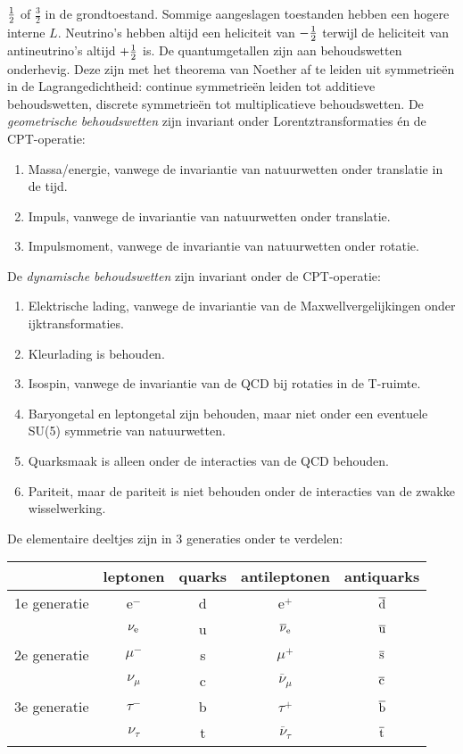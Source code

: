 $\mbox{$\frac{1}{2}$}$ of $\frac{3}{2}$ in de grondtoestand. Sommige aangeslagen toestanden
hebben een hogere interne $L$. Neutrino's hebben altijd een heliciteit van
$-\mbox{$\frac{1}{2}$}$ terwijl de heliciteit van antineutrino's altijd $+\mbox{$\frac{1}{2}$}$ is.
\npar
De quantumgetallen zijn aan behoudswetten onderhevig. Deze zijn met het
theorema van Noether af te leiden uit symmetrie\"en in de Lagrangedichtheid:
continue symmetrie\"en leiden tot additieve behoudswetten, discrete
symmetrie\"en tot multiplicatieve behoudswetten.
\npar
De {\it geometrische behoudswetten} zijn invariant onder Lorentztransformaties
\'en de CPT-operatie:
\begin{enumerate}
\setlength{\itemsep}{0mm}
\item Massa/energie, vanwege de invariantie van natuurwetten onder translatie in de tijd.
\item Impuls, vanwege de invariantie van natuurwetten onder translatie.
\item Impulsmoment, vanwege de invariantie van natuurwetten onder rotatie.
\end{enumerate}
De {\it dynamische behoudswetten} zijn invariant onder de CPT-operatie:
\begin{enumerate}
\setlength{\itemsep}{0mm}
\item Elektrische lading, vanwege de invariantie van de Maxwellvergelijkingen
      onder ijktransformaties.
\item Kleurlading is behouden.
\item Isospin, vanwege de invariantie van de QCD bij rotaties in de T-ruimte.
\item Baryongetal en leptongetal zijn behouden, maar niet onder een eventuele
      SU(5) symmetrie van natuurwetten.
\item Quarksmaak is alleen onder de interacties van de QCD behouden.
\item Pariteit, maar de pariteit is niet behouden onder de interacties van
      de zwakke wisselwerking.
\end{enumerate}
De elementaire deeltjes zijn in 3 generaties onder te verdelen:
\begin{center}
\begin{tabular}{||l|c|c|c|c||}
\hline
&leptonen&quarks&antileptonen&antiquarks\\
\hline
1e generatie&e$^-$ &d&e$^+$&$\overline{\rm d}$\rule{0pt}{12pt}\\
 &$\nu_{\rm e}$&u&$\overline{\nu}_{\rm e}$&$\overline{\rm u}$\\
\hline
2e generatie&$\mu^-$ &s&$\mu^+$&$\overline{\rm s}$\rule{0pt}{12pt}\\
 &$\nu_\mu$&c&$\overline{\nu}_\mu$&$\overline{\rm c}$\\
\hline
3e generatie&$\tau^-$ &b&$\tau^+$&$\overline{\rm b}$\rule{0pt}{12pt}\\
 &$\nu_\tau$&t&$\overline{\nu}_\tau$&$\overline{\rm t}$\\
\hline
\end{tabular}
\end{center}
